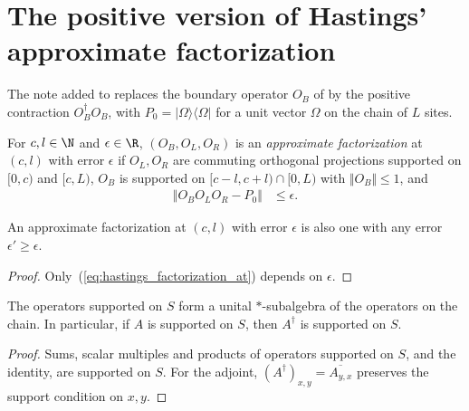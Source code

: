 \section{The positive version of Hastings' approximate factorization}
\label{sec:hastings_positive_factorization}


The note added to \cite[lines 912--943]{Hastings2007AreaLaw} replaces the
boundary operator $O_B$ of \cite[Lemma~1]{Hastings2007AreaLaw} by the positive
contraction $O_B^\dagger O_B$, with $P_0=|\Omega\rangle\langle\Omega|$ for a
unit vector $\Omega$ on the chain of $L$ sites.

\begin{definition}
    \label{def:hastings_factorization_at}
    \leanok
    For $c,l\in\N$ and $\epsilon\in\R$, $(O_B,O_L,O_R)$ is an \emph{approximate
        factorization} at $(c,l)$ with error $\epsilon$ if $O_L,O_R$ are commuting
    orthogonal projections supported on $\lbrack0,c)$ and $\lbrack c,L)$, $O_B$ is supported
    on $\lbrack c-l,c+l)\cap\lbrack0,L)$ with $\Vert O_B\Vert\le1$, and
    \begin{align}
        \Vert O_BO_LO_R-P_0\Vert & \le\epsilon.
        \label{eq:hastings_factorization_at}
    \end{align}
\end{definition}

\begin{lemma}
    \label{thm:hastings_factorization_mono}
    \leanok
    An approximate factorization at $(c,l)$ with error $\epsilon$ is also one
    with any error $\epsilon'\ge\epsilon$.
\end{lemma}
\begin{proof}\leanok
    Only~(\ref{eq:hastings_factorization_at}) depends on $\epsilon$.
\end{proof}

\begin{lemma}
    \label{thm:hastings_supported_conj_transpose}
    \leanok
    The operators supported on $S$ form a unital $*$-subalgebra of the
    operators on the chain. In particular, if $A$ is supported on $S$, then
    $A^\dagger$ is supported on $S$.
\end{lemma}
\begin{proof}\leanok
    Sums, scalar multiples and products of operators supported on $S$, and the
    identity, are supported on $S$. For the adjoint,
    $(A^\dagger)_{x,y}=\overline{A_{y,x}}$ preserves the support condition on
    $x,y$.
\end{proof}

